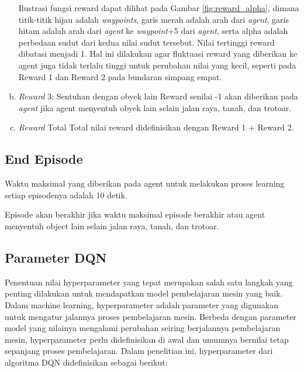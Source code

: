 \documentclass[conference]{IEEEtran}
\begin{document}
\begin{enumerate}[a)]
Ilustrasi fungsi reward dapat dilihat pada Gambar \ref{fig:reward_alpha}, dimana titik-titik hijau adalah \textit{waypoints}, garis merah adalah arah dari \textit{agent}, garis hitam adalah arah dari \textit{agent} ke \textit{waypoint}+5 dari \textit{agent}, serta alpha adalah perbedaan sudut dari kedua nilai sudut tersebut. Nilai tertinggi reward dibatasi menjadi 1. Hal ini dilakukan agar fluktuasi reward yang diberikan ke agent juga tidak terlalu tinggi untuk perubahan nilai yang kecil, seperti pada Reward 1 dan Reward 2 pada bundaran simpang empat.

\item{\textit{Reward} 3: Sentuhan dengan obyek lain}
Reward senilai -1 akan diberikan pada \textit{agent} jika agent menyentuh obyek lain selain jalan raya, tanah, dan trotoar.

\item{\textit{Reward }Total}
Total nilai reward didefinisikan dengan Reward 1 + Reward 2.

\end{enumerate}


\subsection{End Episode}
\label{sec:end_episode}
Waktu maksimal yang diberikan pada agent untuk melakukan proses learning setiap episodenya adalah 10 detik.

Episode akan berakhir jika waktu maksimal episode berakhir atau agent menyentuh object lain selain jalan raya, tanah, dan trotoar.

\subsection{Parameter DQN}
\label{sec:parameter_dqn}
Penentuan nilai hyperparameter yang tepat merupakan salah satu langkah yang penting dilakukan untuk mendapatkan model pembelajaran mesin yang baik. Dalam machine learning, hyperparameter adalah parameter yang digunakan untuk mengatur jalannya proses pembelajaran mesin. Berbeda dengan parameter model yang nilainya mengalami perubahan seiring berjalannya pembelajaran mesin, hyperparameter perlu didefinisikan di awal dan umumnya bernilai tetap sepanjang proses pembelajaran. Dalam penelitian ini, hyperparameter dari algoritma DQN didefinisikan sebagai berikut:
\end{document}
